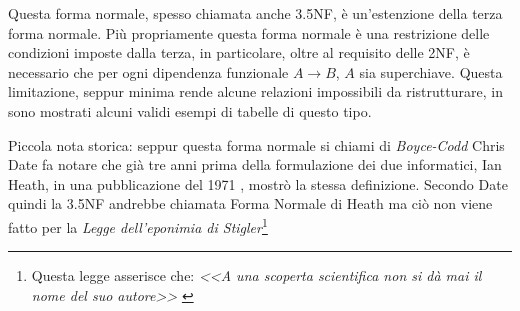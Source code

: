 Questa forma normale, spesso chiamata anche 3.5NF, è un'estenzione della terza forma normale. Più propriamente questa forma normale è una restrizione delle condizioni imposte dalla terza, in particolare, oltre al requisito delle 2NF, è necessario che per ogni dipendenza funzionale $A \rightarrow B$, $A$ sia superchiave. Questa limitazione, seppur minima rende alcune relazioni impossibili da ristrutturare, in \cite{wiki:bcnf} sono mostrati alcuni validi esempi di tabelle di questo tipo.

Piccola nota storica: seppur questa forma normale si chiami di \emph{Boyce-Codd} Chris Date fa notare che già tre anni prima della formulazione dei due informatici, Ian Heath, in una pubblicazione del 1971 \cite{heath:bcnf}, mostrò la stessa definizione. Secondo Date quindi la 3.5NF andrebbe chiamata Forma Normale di Heath ma ciò non viene fatto per la \emph{Legge dell'eponimia di Stigler}\footnote{Questa legge asserisce che: \emph{<<A una scoperta scientifica non si dà mai il nome del suo autore>>} \cite{stigler} }
